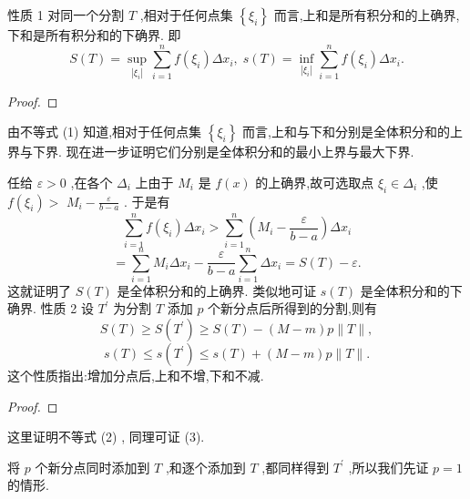 性质 1 对同一个分割 \(T\) ,相对于任何点集 \(\left\{  {\xi }_{i}\right\}\) 而言,上和是所有积分和的上确界, 下和是所有积分和的下确界. 即
\[
S\left( T\right)  = \mathop{\sup }\limits_{\left| {\xi }_{i}\right| }\mathop{\sum }\limits_{{i = 1}}^{n}f\left( {\xi }_{i}\right) \Delta {x}_{i},\;s\left( T\right)  = \mathop{\inf }\limits_{\left| {\xi }_{i}\right| }\mathop{\sum }\limits_{{i = 1}}^{n}f\left( {\xi }_{i}\right) \Delta {x}_{i}.
\]
\begin{proof}

\end{proof}
由不等式 (1) 知道,相对于任何点集 \(\left\{  {\xi }_{i}\right\}\) 而言,上和与下和分别是全体积分和的上界与下界. 现在进一步证明它们分别是全体积分和的最小上界与最大下界.

任给 \(\varepsilon  > 0\) ,在各个 \({\Delta }_{i}\) 上由于 \({M}_{i}\) 是 \(f\left( x\right)\) 的上确界,故可选取点 \({\xi }_{i} \in  {\Delta }_{i}\) ,使 \(f\left( {\xi }_{i}\right)  >\)  \({M}_{i} - \frac{\varepsilon }{b - a}\) . 于是有
\[
\mathop{\sum }\limits_{{i = 1}}^{n}f\left( {\xi }_{i}\right) \Delta {x}_{i} > \mathop{\sum }\limits_{{i = 1}}^{n}\left( {{M}_{i} - \frac{\varepsilon }{b - a}}\right) \Delta {x}_{i}
\]
\[
= \mathop{\sum }\limits_{{i = 1}}^{n}{M}_{i}\Delta {x}_{i} - \frac{\varepsilon }{b - a}\mathop{\sum }\limits_{{i = 1}}^{n}\Delta {x}_{i} = S\left( T\right)  - \varepsilon .
\]
这就证明了 \(S\left( T\right)\) 是全体积分和的上确界. 类似地可证 \(s\left( T\right)\) 是全体积分和的下确界. 性质 2 设 \({T}^{\prime }\) 为分割 \(T\) 添加 \(p\) 个新分点后所得到的分割,则有
\[
S\left( T\right)  \geq  S\left( {T}^{\prime }\right)  \geq  S\left( T\right)  - \left( {M - m}\right) p\parallel T\parallel , \tag{2}
\]
\[
s\left( T\right)  \leq  s\left( {T}^{\prime }\right)  \leq  s\left( T\right)  + \left( {M - m}\right) p\parallel T\parallel . \tag{3}
\]
这个性质指出:增加分点后,上和不增,下和不减.

\begin{proof}

\end{proof}
这里证明不等式 (2) , 同理可证 (3).

将 \(p\) 个新分点同时添加到 \(T\) ,和逐个添加到 \(T\) ,都同样得到 \({T}^{\prime }\) ,所以我们先证 \(p = 1\) 的情形.

